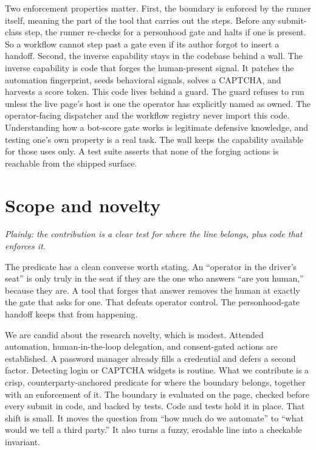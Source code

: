 \documentclass[11pt]{article}
\begin{document}
Two enforcement properties matter. First, the boundary is enforced by the runner itself, meaning the part of the tool that carries out the steps. Before any submit-class step, the runner re-checks for a personhood gate and halts if one is present. So a workflow cannot step past a gate even if its author forgot to insert a handoff. Second, the inverse capability stays in the codebase behind a wall. The inverse capability is code that forges the human-present signal. It patches the automation fingerprint, seeds behavioral signals, solves a CAPTCHA, and harvests a score token. This code lives behind a guard. The guard refuses to run unless the live page's host is one the operator has explicitly named as owned. The operator-facing dispatcher and the workflow registry never import this code. Understanding how a bot-score gate works is legitimate defensive knowledge, and testing one's own property is a real task. The wall keeps the capability available for those uses only. A test suite asserts that none of the forging actions is reachable from the shipped surface.

\section{Scope and novelty}
\emph{Plainly: the contribution is a clear test for where the line belongs, plus code that enforces it.}

The predicate has a clean converse worth stating. An ``operator in the driver's seat'' is only truly in the seat if they are the one who answers ``are you human,'' because they are. A tool that forges that answer removes the human at exactly the gate that asks for one. That defeats operator control. The personhood-gate handoff keeps that from happening.

We are candid about the research novelty, which is modest. Attended automation, human-in-the-loop delegation, and consent-gated actions are established. A password manager already fills a credential and defers a second factor. Detecting login or CAPTCHA widgets is routine. What we contribute is a crisp, counterparty-anchored predicate for where the boundary belongs, together with an enforcement of it. The boundary is evaluated on the page, checked before every submit in code, and backed by tests. Code and tests hold it in place. That shift is small. It moves the question from ``how much do we automate'' to ``what would we tell a third party.'' It also turns a fuzzy, erodable line into a checkable invariant.
\end{document}
